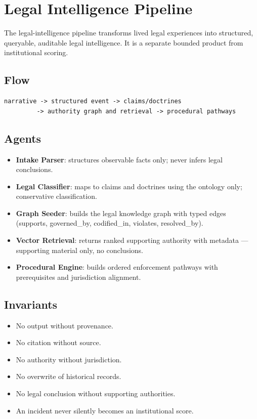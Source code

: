 \section{Legal Intelligence Pipeline}

The legal-intelligence pipeline transforms lived legal experiences into
structured, queryable, auditable legal intelligence. It is a separate bounded
product from institutional scoring.

\subsection{Flow}

\begin{lstlisting}
narrative -> structured event -> claims/doctrines
         -> authority graph and retrieval -> procedural pathways
\end{lstlisting}

\subsection{Agents}

\begin{itemize}
  \item \textbf{Intake Parser}: structures observable facts only; never
        infers legal conclusions.
  \item \textbf{Legal Classifier}: maps to claims and doctrines using the
        ontology only; conservative classification.
  \item \textbf{Graph Seeder}: builds the legal knowledge graph with typed
        edges (supports, governed\_by, codified\_in, violates, resolved\_by).
  \item \textbf{Vector Retrieval}: returns ranked supporting authority with
        metadata --- supporting material only, no conclusions.
  \item \textbf{Procedural Engine}: builds ordered enforcement pathways with
        prerequisites and jurisdiction alignment.
\end{itemize}

\subsection{Invariants}

\begin{itemize}
  \item No output without provenance.
  \item No citation without source.
  \item No authority without jurisdiction.
  \item No overwrite of historical records.
  \item No legal conclusion without supporting authorities.
  \item An incident never silently becomes an institutional score.
\end{itemize}
